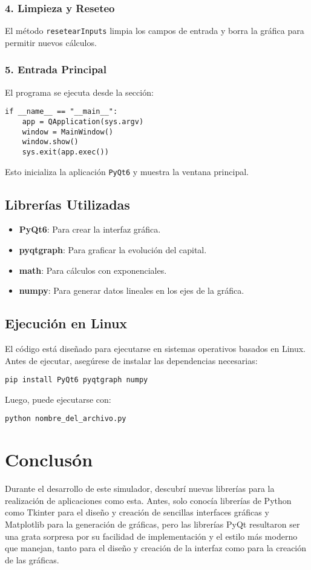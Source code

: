 \documentclass{article}
\begin{document}
\subsubsection{4. Limpieza y Reseteo}
El método \texttt{resetearInputs} limpia los campos de entrada y borra la gráfica para permitir nuevos cálculos.

\subsubsection{5. Entrada Principal}
El programa se ejecuta desde la sección:
\begin{verbatim}
if __name__ == "__main__":
    app = QApplication(sys.argv)
    window = MainWindow()
    window.show()
    sys.exit(app.exec())
\end{verbatim}
Esto inicializa la aplicación \texttt{PyQt6} y muestra la ventana principal.

\subsection{Librerías Utilizadas}
\begin{itemize}
    \item \textbf{PyQt6}: Para crear la interfaz gráfica.
    \item \textbf{pyqtgraph}: Para graficar la evolución del capital.
    \item \textbf{math}: Para cálculos con exponenciales.
    \item \textbf{numpy}: Para generar datos lineales en los ejes de la gráfica.
\end{itemize}

\subsection{Ejecución en Linux}
El código está diseñado para ejecutarse en sistemas operativos basados en Linux. Antes de ejecutar, asegúrese de instalar las dependencias necesarias:
\begin{verbatim}
pip install PyQt6 pyqtgraph numpy
\end{verbatim}
Luego, puede ejecutarse con:
\begin{verbatim}
python nombre_del_archivo.py
\end{verbatim}

\section{Conclusón}
Durante el desarrollo de este simulador, descubrí nuevas librerías para la realización de aplicaciones como esta. Antes, solo conocía librerías de Python como Tkinter para el diseño y creación de sencillas interfaces gráficas y Matplotlib para la generación de gráficas, pero las librerías PyQt resultaron ser una grata sorpresa por su facilidad de implementación y el estilo más moderno que manejan, tanto para el diseño y creación de la interfaz como para la creación de las gráficas.
\end{document}
